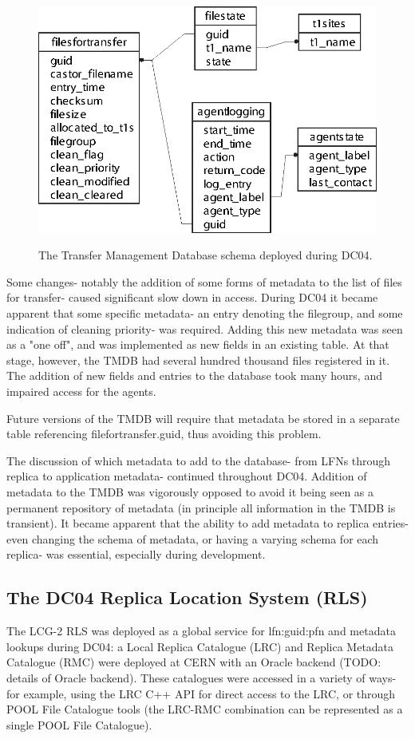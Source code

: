 \documentclass{cmspaper}
\begin{document}
\begin{figure}[tbp]
\centering
\includegraphics{v1_tmdb.eps}
\label{fig:schema}
\caption{The Transfer Management Database schema deployed during DC04.}
\end{figure} 

Some changes- notably the addition of some forms of metadata to the list of files for transfer- caused significant slow down in access. During DC04 it became apparent that some specific metadata- an entry denoting the filegroup, and some indication of cleaning priority- was required. Adding this new metadata was seen as a "one off", and was implemented as new fields in an existing table. At that stage, however, the TMDB had several hundred thousand files registered in it. The addition of new fields and entries to the database took many hours, and impaired access for the agents.

Future versions of the TMDB will require that metadata be stored in a separate table referencing filefortransfer.guid, thus avoiding this problem.

The discussion of which metadata to add to the database- from LFNs through replica to application metadata- continued throughout DC04. Addition of metadata to the TMDB was vigorously opposed to avoid it being seen as a permanent repository of metadata (in principle all information in the TMDB is transient). It became apparent that the ability to add metadata to replica entries- even changing the schema of metadata, or having a varying schema for each replica- was essential, especially during development.

\subsection{The DC04 Replica Location System (RLS)}
The LCG-2 RLS was deployed as a global service for lfn:guid:pfn and metadata lookups during DC04: a Local Replica Catalogue (LRC) and Replica Metadata Catalogue (RMC) were deployed at CERN with an Oracle backend (TODO: details of Oracle backend). These catalogues were accessed in a variety of ways- for example, using the LRC C++ API for direct access to the LRC, or through POOL File Catalogue tools (the LRC-RMC combination can be represented as a single POOL File Catalogue).
\end{document}
